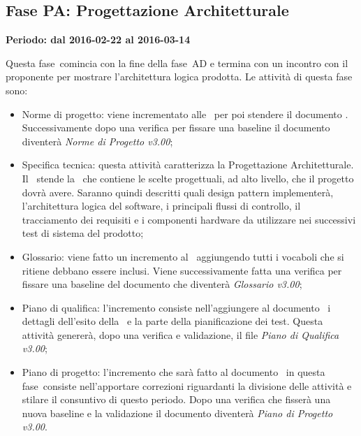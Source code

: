 \documentclass[../PianoProgetto.tex]{subfiles}
\begin{document}
	\subsection{Fase PA: Progettazione Architetturale}
		\textbf{Periodo: dal 2016-02-22 al 2016-03-14}
		
		Questa fase\g\ comincia con la fine della fase\g\ AD e termina con un incontro con il proponente per mostrare l'architettura logica prodotta. Le attività di questa fase sono:
		\begin{itemize}
			\item Norme di progetto: viene incrementato alle \normediprogetto\ per poi stendere il documento \specificatecnica . Successivamente dopo una verifica per fissare una baseline il documento diventerà \textit{Norme di Progetto v3.00};

			\item Specifica tecnica: questa attività caratterizza la Progettazione Architetturale. Il \progettista\ stende la \specificatecnica\ che contiene le scelte progettuali, ad alto livello, che il progetto dovrà avere. Saranno quindi descritti quali design pattern implementerà, l'architettura logica del software\g , i principali flussi di controllo, il tracciamento dei requisiti e i componenti hardware da utilizzare nei successivi test di sistema del prodotto;

			\item Glossario: viene fatto un incremento al \glossario\ aggiungendo tutti i vocaboli che si ritiene debbano essere inclusi. Viene successivamente fatta una verifica per fissare una baseline del documento che diventerà \textit{Glossario v3.00};

 			\item Piano di qualifica: l'incremento consiste nell'aggiungere al documento \pianodiqualifica\ i dettagli dell'esito della \revisionedeirequisiti\ e la parte della pianificazione dei test. Questa attività genererà, dopo una verifica e validazione, il file \textit{Piano di Qualifica v3.00};

			\item Piano di progetto: l'incremento che sarà fatto al documento \pianodiprogetto\ in questa fase\g\ consiste nell'apportare correzioni riguardanti la divisione delle attività e stilare il consuntivo di questo periodo. Dopo una verifica che fisserà una nuova baseline e la validazione il documento diventerà \textit{Piano di Progetto v3.00}.
						
		\end{itemize}
		
\end{document}
